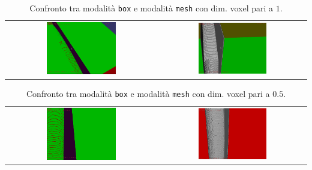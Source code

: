 \begin{center}
\begin{table}[hbtp]
  \begin{tabular}{cc}
   \includegraphics[width=0.48\textwidth]{img/screenshots/pos2_box_v1.png} &%
   \includegraphics[width=0.48\textwidth]{img/screenshots/pos2_mesh_v1_2.png}\\
  \end{tabular}
  \caption{Confronto tra modalità \texttt{box} e modalità \texttt{mesh} con dim. voxel pari a $1$.}
  \label{tab:confrontobm2}
\end{table}
\end{center}

\begin{center}
\begin{table}[hbtp]
  \begin{tabular}{cc}
   \includegraphics[width=0.48\textwidth]{img/screenshots/pos2_box_v05.png} &%
   \includegraphics[width=0.48\textwidth]{img/screenshots/pos2_mesh_v05.png}\\
  \end{tabular}
  \caption{Confronto tra modalità \texttt{box} e modalità \texttt{mesh} con dim. voxel pari a $0.5$.}
  \label{tab:confrontobm3}
\end{table}
\end{center}


